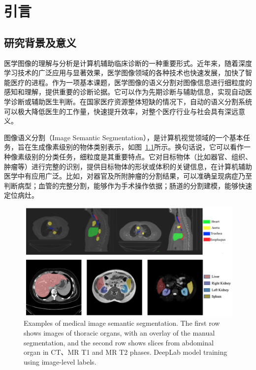 \chapter{引言}

\section{研究背景及意义}
医学图像的理解与分析是计算机辅助临床诊断的一种重要形式。近年来，随着深度学习技术的广泛应用与显著效果，医学图像领域的各种技术也快速发展，加快了智能医疗的进程。作为一项基本课题，医学图像的语义分割对图像信息进行细粒度的感知和理解，提供重要的诊断论据。它可以作为先期诊断与辅助信息，实现自动医学诊断或辅助医生判断。在国家医疗资源整体短缺的情况下，自动的语义分割系统可以极大降低医生的工作量，快速提升效率，对整个医疗行业与社会具有深远意义。

图像语义分割（Image Semantic Segmentation），是计算机视觉领域的一个基本任务，旨在生成像素级别的物体类别表示\citep{long2015fully,chen2017deeplab,ronneberger2015u,isensee2019automated}，如图~\ref{c1_fig1}所示。换句话说，它可以看作一种像素级别的分类任务，细粒度是其重要特点。它对目标物体（比如器官、组织、肿瘤等）进行完整的识别，提供目标物体的形状或体积的关键信息，在计算机辅助医学中有应用广泛。比如，对器官及所附肿瘤的分割结果，可以准确呈现病症乃至判断病型；血管的完整分割，能够作为手术操作依据；肠道的分割建模，能够快速定位病灶。

    \begin{figure}[t!]
        \centering 
        \includegraphics[width=1.0\textwidth]{img/c1/intro_1.png}
        {Examples of medical image semantic segmentation. The first row shows images of thoracic organs, with an overlay of the manual segmentation, and the second row shows slices from abdominal organ in CT、MR T1 and MR T2 phases.
        DeepLab model training using image-level labels.}
        \label{c1_fig1}
    \end{figure}


